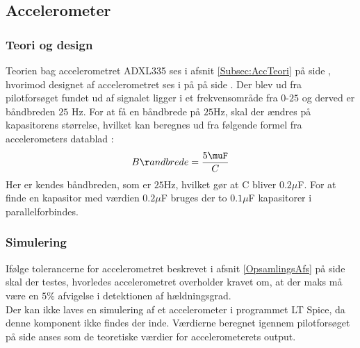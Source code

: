 \subsection{Accelerometer}
\subsubsection{Teori og design}
Teorien bag accelerometret ADXL335 ses i afsnit \ref{Subsec:AccTeori} på side \pageref{Subsec:AccTeori}, hvorimod designet af accelerometret ses i på  på side \pageref{pforsoeg1}. Der blev ud fra pilotforsøget fundet ud af signalet ligger i et frekvensområde fra $0$-$25$ og derved er båndbreden $25$ Hz. For at få en båndbrede på $25$Hz, skal der ændres på kapasitorens størrelse, hvilket kan beregnes ud fra følgende formel fra accelerometers datablad \cite{Device2009}:
\begin{equation}
Båndbrede = \dfrac{5\muF}{C}
\end{equation}
Her er kendes båndbreden, som er $25$Hz, hvilket gør at C bliver $0.2\mu$F. For at finde en kapasitor med værdien $0.2\mu$F bruges der to $0.1\mu$F kapasitorer i parallelforbindes.  

\subsubsection{Simulering}
Ifølge tolerancerne for accelerometret beskrevet i afsnit \ref{OpsamlingsAfs} på side \pageref{OpsamlingsAfs} skal der testes, hvorledes accelerometret overholder kravet om, at der maks må være en $5\%$ afvigelse i detektionen af hældningsgrad. \\
Der kan ikke laves en simulering af et accelerometer i programmet LT Spice, da denne komponent ikke findes der inde. Værdierne beregnet igennem pilotforsøget på side \pageref{Sec:Pilotforsoeg} anses som de teoretiske værdier for accelerometerets output.

